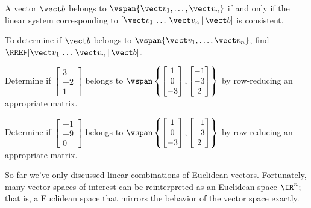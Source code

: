 


\begin{applicationActivities}

\begin{fact}
  A vector \(\vect b\) belongs to
  \(\vspan\{\vect v_1,\dots,\vect v_n\}\) if and only if
  the linear system corresponding to
  \([\vect v_1\,\dots\,\vect v_n \,|\, \vect b]\)
  is consistent.
\end{fact}

\begin{remark}
  To determine if \(\vect b\) belongs to
  \(\vspan\{\vect v_1,\dots,\vect v_n\}\), find
  \(\RREF[\vect v_1\,\dots\,\vect v_n \,|\, \vect b]\).
\end{remark}

\begin{activity}{5}
  Determine if
  \(\begin{bmatrix}3\\-2\\1\end{bmatrix}\) belongs to
  \(\vspan\left\{\begin{bmatrix}1\\0\\-3\end{bmatrix},
  \begin{bmatrix}-1\\-3\\2\end{bmatrix}\right\}\)
  by row-reducing an appropriate matrix.
\end{activity}

\begin{activity}{5}
  Determine if
  \(\begin{bmatrix}-1\\-9\\0\end{bmatrix}\) belongs to
  \(\vspan\left\{\begin{bmatrix}1\\0\\-3\end{bmatrix},
  \begin{bmatrix}-1\\-3\\2\end{bmatrix}\right\}\)
  by row-reducing an appropriate matrix.
\end{activity}


\begin{observation}
  So far we've only discussed linear combinations of Euclidean vectors.
  Fortunately, many vector spaces of interest can be reinterpreted as an
   Euclidean space \(\IR^n\); that is, a Euclidean space
  that mirrors the behavior of the vector space exactly.
\end{observation}


\end{applicationActivities}
